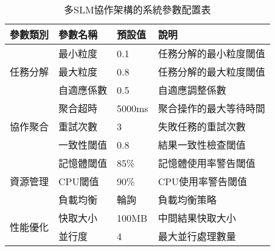 \begin{table}[h]
\centering
\small
\caption[系統參數設定]{多SLM協作架構的系統參數配置表}
\label{table:system_parameters}
\begin{tabular}{llll}
\toprule[1.1pt]
參數類別 & 參數名稱 & 預設值 & 說明\\
\midrule[1.1pt]
\multirow{3}{*}{任務分解} & 最小粒度 & 0.1 & 任務分解的最小粒度閾值\\
& 最大粒度 & 0.8 & 任務分解的最大粒度閾值\\
& 自適應係數 & 0.5 & 自適應調整係數\\
\midrule[1.1pt]
\multirow{3}{*}{協作聚合} & 聚合超時 & 5000ms & 聚合操作的最大等待時間\\
& 重試次數 & 3 & 失敗任務的重試次數\\
& 一致性閾值 & 0.8 & 結果一致性檢查閾值\\
\midrule[1.1pt]
\multirow{3}{*}{資源管理} & 記憶體閾值 & 85\% & 記憶體使用率警告閾值\\
& CPU閾值 & 90\% & CPU使用率警告閾值\\
& 負載均衡 & 輪詢 & 負載均衡策略\\
\midrule[1.1pt]
\multirow{2}{*}{性能優化} & 快取大小 & 100MB & 中間結果快取大小\\
& 並行度 & 4 & 最大並行處理數量\\
\bottomrule[1.1pt]
\end{tabular}
\end{table} 
